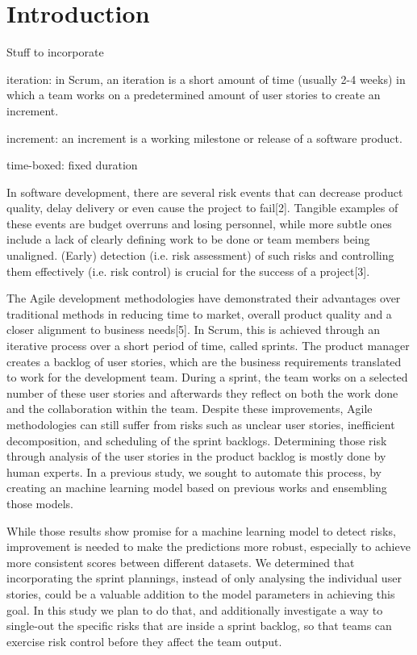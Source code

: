 \documentclass[sigconf]{acmart}
\begin{document}
\section{Introduction}
Stuff to incorporate

iteration: in Scrum, an iteration is a short amount of time (usually 2-4 weeks) in which a team works on a predetermined amount of user stories to create an increment.

increment: an increment is a working milestone or release of a software product.

time-boxed: fixed duration

In software development, there are several risk events that can decrease product quality, delay delivery or even cause the project to fail[2]. 
Tangible examples of these events are budget overruns and losing personnel, while more subtle ones include a lack of clearly defining work to be done or team members being unaligned. 
(Early) detection (i.e. risk assessment) of such risks and controlling them effectively (i.e. risk control) is crucial for the success of a project[3].

The Agile development methodologies have demonstrated their advantages over traditional methods in reducing time to market, overall product quality and a closer alignment to business needs[5]. 
In Scrum, this is achieved through an iterative process over a short period of time, called sprints. The product manager creates a backlog of user stories, which are the business requirements translated to work for the development team. 
During a sprint, the team works on a selected number of these user stories and afterwards they reflect on both the work done and the collaboration within the team.
Despite these improvements, Agile methodologies can still suffer from risks such as unclear user stories, inefficient decomposition, and scheduling of the sprint backlogs. 
Determining those risk through analysis of the user stories in the product backlog is mostly done by human experts. 
In a previous study, we sought to automate this process, by creating an machine learning model based on previous works and ensembling those models. 

While those results show promise for a machine learning model to detect risks, improvement is needed to make the predictions more robust, especially to achieve more consistent scores between different datasets.
We determined that incorporating the sprint plannings, instead of only analysing the individual user stories, could be a valuable addition to the model parameters in achieving this goal. In this study we plan to do that, and additionally investigate a way to single-out the specific risks that are inside a sprint backlog, so that teams can exercise risk control before they affect the team output.
\end{document}
